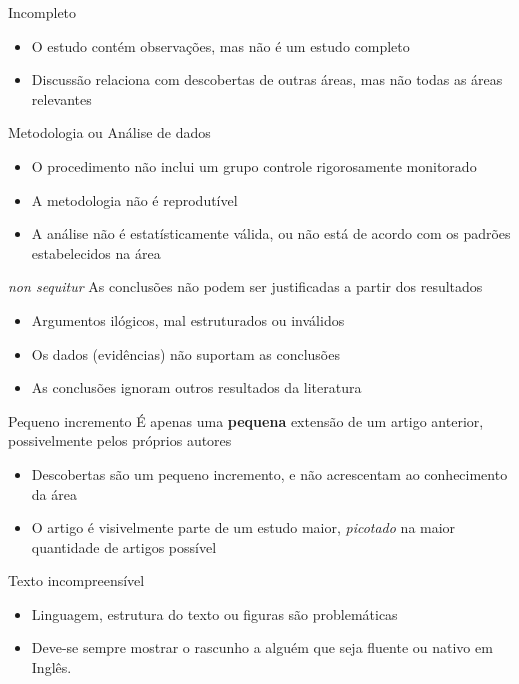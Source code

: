 \documentclass{beamer}
\begin{document}
\begin{frame}{Incompleto}
  \begin{itemize}
  \item O estudo contém observações, mas não é um estudo completo
  \item Discussão relaciona com descobertas de outras áreas, mas não
    todas as áreas relevantes
  \end{itemize}
\end{frame}

\begin{frame}{Metodologia ou Análise de dados}
  \begin{itemize}
  \item O procedimento não inclui um grupo controle rigorosamente
    monitorado
  \item A metodologia não é reprodutível
  \item A análise não é estatísticamente válida, ou não está de acordo
    com os padrões estabelecidos na área
  \end{itemize}
\end{frame}

\begin{frame}{{\em non sequitur}}
  As conclusões não podem ser justificadas a partir dos resultados
  \begin{itemize}
  \item Argumentos ilógicos, mal estruturados ou inválidos
  \item Os dados (evidências) não suportam as conclusões
  \item As conclusões ignoram outros resultados da literatura
  \end{itemize}
\end{frame}

\begin{frame}{Pequeno incremento}
  É apenas uma {\bf pequena} extensão de um artigo anterior,
  possivelmente pelos próprios autores
  \begin{itemize}
  \item Descobertas são um pequeno incremento, e não acrescentam ao
    conhecimento da área
  \item O artigo é visivelmente parte de um estudo maior, {\em
      picotado} na maior quantidade de artigos possível
  \end{itemize}
\end{frame}

\begin{frame}{Texto incompreensível}
  \begin{itemize}
  \item Linguagem, estrutura do texto ou figuras são problemáticas
  \item Deve-se sempre mostrar o rascunho a alguém que seja fluente ou
    nativo em Inglês.
  \end{itemize}
\end{frame}
\end{document}
